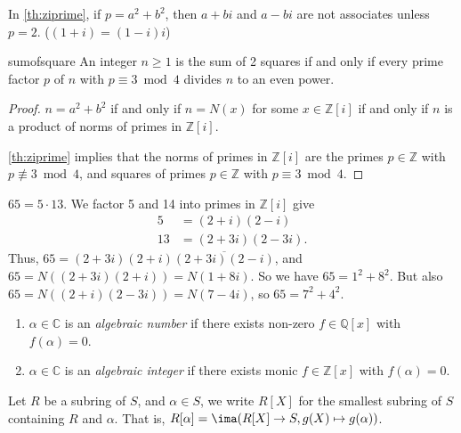 \begin{remark}
    In \cref{th:ziprime}, if \(p = a^2 + b^2\), then \(a + bi\) and \(a - bi\) are not associates unless \(p = 2\). (\((1 + i) = (1-i)i\))
\end{remark}
\begin{corollary}{}{sumofsquare}
    An integer \(n \geq 1\) is the sum of 2 squares if and only if every prime factor \(p\) of \(n\) with \(p \equiv 3 \bmod 4\) divides \(n\) to an even power.
\end{corollary}
\begin{proof}
    \(n = a^2 + b^2\) if and only if \(n = N(x)\) for some \(x \in \mathbb{Z}[i]\) if and only if \(n\) is a product of norms of primes in \(\mathbb{Z}[i]\).

    \cref{th:ziprime} implies that the norms of primes in \(\mathbb{Z}[i]\) are the primes \(p \in \mathbb{Z}\) with \(p \not \equiv 3 \bmod 4\), and squares of primes \(p \in \mathbb{Z}\) with \(p \equiv 3 \bmod 4\).
\end{proof}
\begin{example}
    \(65 = 5 \cdot 13\). We factor 5 and 14 into primes in \(\mathbb{Z}[i]\) give
    \begin{align*}
        5 &= (2 + i)(2-i)\\
        13 &= (2 + 3i)(2-3i).
    \end{align*}
    Thus, \(65 = (2 + 3i)(2 + i)\overline{(2 + 3i)(2 - i)}\), and \(65 = N((2 + 3i)(2 + i)) = N(1 + 8i)\). So we have \(65 = 1^2 + 8^2\).  But also \(65 = N((2 + i)(2 - 3i)) = N(7 - 4i)\), so \(65 = 7^2 + 4^2\).
\end{example}
\begin{definition}{}{}
    \begin{enumerate}
        \item \(\alpha \in \mathbb{C}\) is an \textit{algebraic number} if there exists non-zero \(f \in \mathbb{Q}[x]\) with \(f(\alpha) = 0\).
        \item \(\alpha \in \mathbb{C}\) is an \textit{algebraic integer} if there exists monic \(f \in \mathbb{Z}[x]\) with \(f(\alpha) = 0\).
    \end{enumerate}
\end{definition}
\begin{notation}
    Let \(R\) be a subring of \(S\), and \(\alpha \in S\), we write \(R[X]\) for the smallest subring of \(S\) containing \(R\) and \(\alpha\). That is, \(R[\alpha] = \ima(R[X] \to S, g(X) \mapsto g(\alpha))\).
\end{notation}
